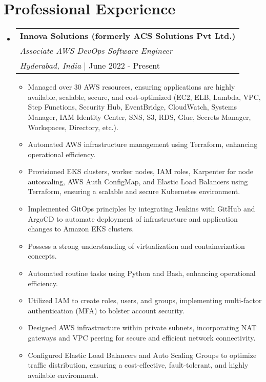 \documentclass[a4paper,10pt]{article}
\newcommand{\resumeItem}[1]{
  \item\small{
    {#1 \vspace{-2pt}}
  }
}
\newcommand{\resumeSubheading}[4]{
  \item
  \begin{tabular*}{\textwidth}{l}
    \textbf{#1} \\  %
    \textit{#2} \\  %
    \textit{#3} | #4 \\  %
  \end{tabular*}\vspace{-5pt}
}
\newcommand{\resumeSubHeadingListStart}{\begin{itemize}[leftmargin=0.15in, label={}]}
\newcommand{\resumeSubHeadingListEnd}{\end{itemize}}
\newcommand{\resumeItemListStart}{\begin{itemize}}
\newcommand{\resumeItemListEnd}{\end{itemize}}
\begin{document}
\section{Professional Experience}
\resumeSubHeadingListStart
  \resumeSubheading
    {Innova Solutions (formerly ACS Solutions Pvt Ltd.)}
    {Associate AWS DevOps Software Engineer}
    {Hyderabad, India}{June 2022 - Present}
    \resumeItemListStart
      \resumeItem{Managed over 30 AWS resources, ensuring applications are highly available, scalable, secure, and cost-optimized (EC2, ELB, Lambda, VPC, Step Functions, Security Hub, EventBridge, CloudWatch, Systems Manager, IAM Identity Center, SNS, S3, RDS, Glue, Secrets Manager, Workspaces, Directory, etc.).}
      \resumeItem{Automated AWS infrastructure management using Terraform, enhancing operational efficiency.}
      \resumeItem{Provisioned EKS clusters, worker nodes, IAM roles, Karpenter for node autoscaling, AWS Auth ConfigMap, and Elastic Load Balancers using Terraform, ensuring a scalable and secure Kubernetes environment.}
      \resumeItem{Implemented GitOps principles by integrating Jenkins with GitHub and ArgoCD to automate deployment of infrastructure and application changes to Amazon EKS clusters.}
      \resumeItem{Possess a strong understanding of virtualization and containerization concepts.}
      \resumeItem{Automated routine tasks using Python and Bash, enhancing operational efficiency.}
      \resumeItem{Utilized IAM to create roles, users, and groups, implementing multi-factor authentication (MFA) to bolster account security.}
      \resumeItem{Designed AWS infrastructure within private subnets, incorporating NAT gateways and VPC peering for secure and efficient network connectivity.}
      \resumeItem{Configured Elastic Load Balancers and Auto Scaling Groups to optimize traffic distribution, ensuring a cost-effective, fault-tolerant, and highly available environment.}
    \resumeItemListEnd
\resumeSubHeadingListEnd



\end{document}
